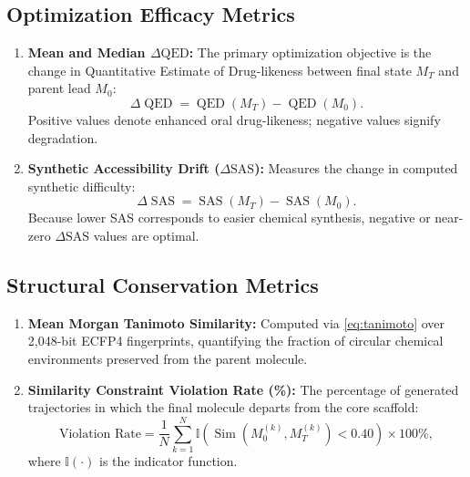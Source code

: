 \documentclass{ieeeaccess}
\begin{document}
\subsection{Optimization Efficacy Metrics}
\begin{enumerate}
    \item \textbf{Mean and Median $\Delta\text{QED}$:} The primary optimization objective is the change in Quantitative Estimate of Drug-likeness between final state $M_T$ and parent lead $M_0$:
    \begin{equation}
    \Delta\operatorname{QED} = \operatorname{QED}(M_T) - \operatorname{QED}(M_0).
    \label{eq:delta_qed}
    \end{equation}
    Positive values denote enhanced oral drug-likeness; negative values signify degradation.
    \item \textbf{Synthetic Accessibility Drift ($\Delta\text{SAS}$):} Measures the change in computed synthetic difficulty:
    \begin{equation}
    \Delta\operatorname{SAS} = \operatorname{SAS}(M_T) - \operatorname{SAS}(M_0).
    \label{eq:delta_sas}
    \end{equation}
    Because lower SAS corresponds to easier chemical synthesis, negative or near-zero $\Delta\text{SAS}$ values are optimal.
\end{enumerate}

\subsection{Structural Conservation Metrics}
\begin{enumerate}
    \item \textbf{Mean Morgan Tanimoto Similarity:} Computed via \eqref{eq:tanimoto} over 2,048-bit ECFP4 fingerprints, quantifying the fraction of circular chemical environments preserved from the parent molecule.
    \item \textbf{Similarity Constraint Violation Rate (\%):} The percentage of generated trajectories in which the final molecule departs from the core scaffold:
    \begin{equation}
    \text{Violation Rate} = \frac{1}{N} \sum_{k=1}^N \mathbb{I}\left( \operatorname{Sim}(M_0^{(k)}, M_T^{(k)}) < 0.40 \right) \times 100\%,
    \label{eq:violation_rate}
    \end{equation}
    where $\mathbb{I}(\cdot)$ is the indicator function.
\end{enumerate}
\end{document}
